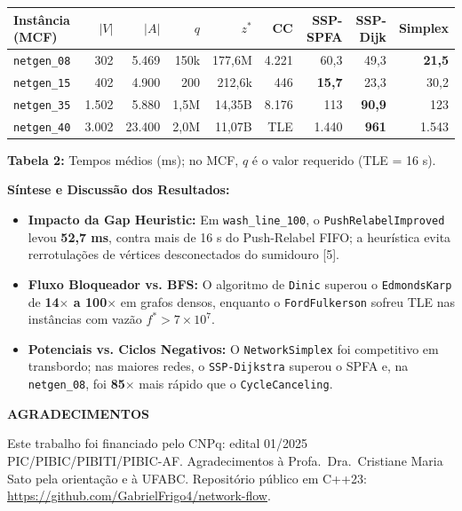 \documentclass[final]{article}
\newcommand{\destaque}[1]{\textcolor{ufabcgreen}{\textbf{#1}}}
\newcommand{\postersection}[1]{
    \par\vspace{0.55em}
    {\fontsize{34}{40}\selectfont\bfseries\color{textdark}#1}
    \par\vspace{0.2em}
}
\newcommand{\postercaption}[2]{
    \par\vspace{0.22em}
    {\fontsize{25}{30}\selectfont\raggedright\textbf{#1:} #2\par}
    \vspace{0.3em}
}
\begin{document}
\begin{minipage}[t]{41.275cm}
{\vspace{0.35cm}

\begin{tabular*}{\linewidth}{@{\extracolsep{\fill}}lrrrr|rrrr@{}}
\toprule
\textbf{Instância (MCF)} & $|V|$ & $|A|$ & $q$ & $z^*$ & \textbf{CC} & \textbf{SSP-SPFA} & \textbf{SSP-Dijk} & \textbf{Simplex} \\
\midrule
\texttt{netgen\_08} & 302   & 5.469  & 150k & 177,6M & 4.221 & 60,3  & 49,3  & \destaque{21,5} \\
\texttt{netgen\_15} & 402   & 4.900  & 200  & 212,6k & 446   & \destaque{15,7}  & 23,3  & 30,2 \\
\texttt{netgen\_35} & 1.502 & 5.880  & 1,5M & 14,35B & 8.176 & 113   & \destaque{90,9}  & 123 \\
\texttt{netgen\_40} & 3.002 & 23.400 & 2,0M & 11,07B & TLE   & 1.440 & \destaque{961}   & 1.543 \\
\bottomrule
\end{tabular*}
}
\postercaption{Tabela 2}{Tempos médios (ms); no MCF, $q$ é o valor requerido (TLE = 16 s).}

\textbf{Síntese e Discussão dos Resultados:}
\begin{itemize}[leftmargin=1.2em, itemsep=0.18em, topsep=0.1em]
    \item \destaque{Impacto da Gap Heuristic:} Em \texttt{wash\_line\_100}, o \texttt{PushRelabelImproved} levou \textbf{52,7 ms}, contra mais de 16 s do Push-Relabel FIFO; a heurística evita rerrotulações de vértices desconectados do sumidouro [5].
    \item \destaque{Fluxo Bloqueador vs. BFS:} O algoritmo de \texttt{Dinic} superou o \texttt{EdmondsKarp} de \textbf{14$\times$ a 100$\times$} em grafos densos, enquanto o \texttt{FordFulkerson} sofreu TLE nas instâncias com vazão $f^* > 7 \times 10^7$.
    \item \destaque{Potenciais vs. Ciclos Negativos:} O \texttt{NetworkSimplex} foi competitivo em transbordo; nas maiores redes, o \texttt{SSP-Dijkstra} superou o SPFA e, na \texttt{netgen\_08}, foi \textbf{85$\times$} mais rápido que o \texttt{CycleCanceling}.
\end{itemize}

\postersection{AGRADECIMENTOS}
Este trabalho foi financiado pelo CNPq: edital 01/2025 PIC/PIBIC/PIBITI/PIBIC-AF. Agradecimentos à Profa.\ Dra.\ Cristiane Maria Sato pela orientação e à UFABC. Repositório público em C++23: \url{https://github.com/GabrielFrigo4/network-flow}.


\end{minipage}
\end{document}
